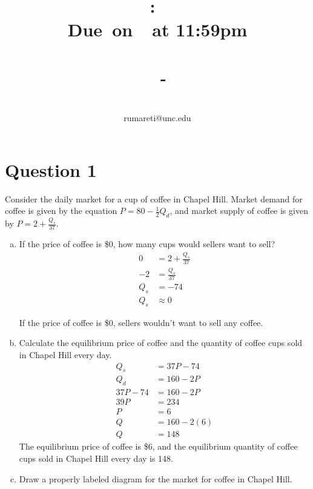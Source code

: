 \documentclass{article}
\title{
    \vspace{2in}
    \textmd{\textbf{\hmwkClass:\ \hmwkTitle}}\\
    \normalsize\vspace{0.1in}\small{\textbf{Due\ on\ \hmwkDueDate\ at 11:59pm}}\\
    \normalsize\text{Tuesday/Thursday 3:30-4:45, Genome Sciences 100}\\
    \vspace{0.1in}\large{\textit{\hmwkClassInstructor\ - \hmwkClassTime}}
    \vspace{3in}
}
\author{\hmwkAuthorName\\\small{rumareti@unc.edu}}
\date{}
\newcommand{\question}[1]{\pagebreak\section{Question #1}}
\begin{document}
\maketitle

\question{1}

Consider the daily market for a cup of coffee in Chapel Hill. Market demand for coffee is given by the equation \(P = 80 - \frac{1}{2}Q_d\), and market supply of coffee is given by \(P = 2 + \frac{Q_s}{37}\).
\begin{enumerate}[(a)]
    \item If the price of coffee is \$0, how many cups would sellers want to
    sell?
    \begin{align*}
        0 &= 2 + \frac{Q_s}{37}\\
        -2 &= \frac{Q_s}{37}\\
        Q_s &= -74\\
        Q_s &\approx 0
    \end{align*}

    If the price of coffee is \$0, sellers wouldn't want to sell any coffee.
    \item Calculate the equilibrium price of coffee and the quantity of coffee
    cups sold in Chapel Hill every day.
    \begin{align*}
        Q_s &= 37P - 74\\
        Q_d &= 160 - 2P\\
        37P - 74 &= 160 - 2P\\
        39P &= 234\\
        P &= 6\\
        Q &= 160 - 2(6)\\
        Q &= 148
    \end{align*}
    The equilibrium price of coffee is \$6, and the equilibrium quantity of coffee cups sold in Chapel Hill every day is 148.
    \item Draw a properly labeled diagram for the market for coffee in Chapel Hill.
    
\end{enumerate}
\end{document}
